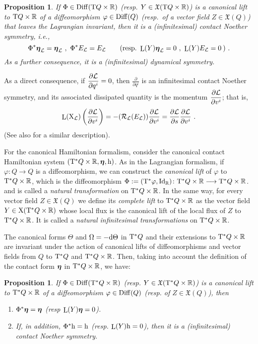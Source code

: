 \documentclass[12pt]{report}
\newtheorem{prop}[teor]{Proposition}
\def\derpar#1#2{\frac{\partial{#1}}{\partial{#2}}}
\def\vf{\mathfrak X}
\def\Lag{{\cal L}}
\def\d{{\rm d}}
\def\Real{\mathbb{R}}
\def\bmeta{\mbox{\boldmath $\eta$}}
\def\X{{\rm X}}
\def\Tan{{\rm T}}
\def\Lie{\mathop{\rm L}\nolimits}
\newcommand{\Reeb}{\mathcal{R}}
\begin{document}
\begin{prop}
If $\Phi\in{\rm Diff}(\Tan Q\times\Real)$ (resp. $Y\in\vf(\Tan Q\times\Real)$) is a canonical lift
to $\Tan Q\times\Real$ of a diffeomorphism $\varphi\in{\rm Diff}(Q)$
(resp.\ of a vector field $Z\in\vf(Q)$)
that leaves the Lagrangian invariant, then
it is a (infinitesimal) contact Noether symmetry, {\it i.e.},
$$
\Phi^*\bmeta_\Lag=\bmeta_\Lag \ ,\
\Phi^*E_\Lag=E_\Lag \qquad 
({\rm resp.}\ \Lie(Y)\bmeta_\Lag=0 \ ,\
\Lie(Y)E_\Lag=0 \:)\ .
$$
As a further consequence, it is a (infinitesimal) dynamical symmetry.
\end{prop}

As a direct consequence, if $\displaystyle\frac{\partial \Lag}{\partial q^i}=0$, 
then $\displaystyle\frac{\partial}{\partial q^i}$ 
is an infinitesimal contact Noether symmetry, and its associated dissipated quantity 
is the momentum 
$\displaystyle\frac{\partial \Lag}{\partial v^i}$;
that is,
$$
\Lie(\X_\Lag)\left(\frac{\partial\Lag}{\partial v^i}\right)=
-(\Reeb_\Lag(E_\Lag))\frac{\partial\Lag}{\partial v^i}=
\derpar{\Lag}{s}\frac{\partial\Lag}{\partial v^i}\ .
$$
(See also \cite{GeGu2002}for a similar description).

For the canonical Hamiltonian formalism, consider
the canonical contact Hamiltonian system $(\Tan^*Q\times\Real,\bmeta,{\rm h})$.
As in the Lagrangian formalism, if $\varphi\colon Q\to Q$ is a diffeomorphism,
we can construct the {\sl canonical lift} of $\varphi$ to $\Tan^*Q\times\Real$,
which is the diffeomorphism 
$\Phi:=(\Tan^*\varphi, {\rm {\rm Id}_{\mathbb R}}) \colon
\Tan^*Q\times\Real
\longrightarrow 
\Tan^*Q\times\Real$.
and is called a {\sl natural transformation} on $\Tan^*Q\times\Real$.
In the same way, for every vector field $Z\in \vf(Q)$
we define its {\sl complete lift}
to $\Tan^*Q\times\Real$ as the vector field
$Y\in\X(\Tan^*Q\times\Real)$
whose local flux is the canonical lift of 
the local flux of $Z$ to $\Tan^*Q\times\Real$.
It is called a {\sl natural infinitesimal transformations} on $\Tan^*Q\times\Real$.

The canonical forms $\Theta$ and $\Omega=-\d\Theta$
in $\Tan^*Q$ and their extensions to $\Tan^*Q\times\Real$ are invariant under the action
of canonical lifts of diffeomorphisms and vector fields from $Q$ to $\Tan^*Q$ and $\Tan^*Q\times\Real$.
Then, taking into account the definition
of the contact form $\bmeta$ in $\Tan^*Q\times\Real$, we have:

\begin{prop}
If
$\Phi\in{\rm Diff}(\Tan^*Q\times\Real)$ (resp. $Y\in\vf(\Tan^*Q\times\Real)$) is a canonical lift to $\Tan^*Q\times\Real$ of a diffeomorphism $\varphi\in{\rm Diff}(Q)$
(resp. of $Z\in\vf(Q)$), then
\begin{enumerate}
    \item
$\Phi^*\bmeta=\bmeta$ (resp $\Lie(Y)\bmeta=0$).
    \item
If, in addition,
$\Phi^*{\rm h}={\rm h}$ (resp. $\Lie(Y){\rm h}=0$),
then it is a  (infinitesimal) contact Noether symmetry.
\end{enumerate}
\end{prop}
\end{document}
